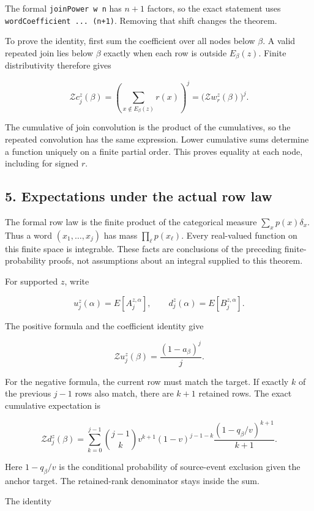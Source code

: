 The formal \texttt{joinPower\ w\ n} has \(n+1\) factors, so the exact statement uses \texttt{wordCoefficient\ ...\ (n+1)}. Removing that shift changes the theorem.

To prove the identity, first sum the coefficient over all nodes below \(\beta\). A valid repeated join lies below \(\beta\) exactly when each row is outside \(E_\beta(z)\). Finite distributivity therefore gives

\[
\mathcal Zc_j^z(\beta)
=\left(\sum_{x\notin E_\beta(z)}r(x)\right)^j
=\bigl(\mathcal Zw_r^z(\beta)\bigr)^j.
\]

The cumulative of join convolution is the product of the cumulatives, so the repeated convolution has the same expression. Lower cumulative sums determine a function uniquely on a finite partial order. This proves equality at each node, including for signed \(r\).

\subsection{5. Expectations under the actual row law}\label{expectations-under-the-actual-row-law}

The formal row law is the finite product of the categorical measure \(\sum_xp(x)\delta_x\). Thus a word \((x_1,\ldots,x_j)\) has mass \(\prod_\ell p(x_\ell)\). Every real-valued function on this finite space is integrable. These facts are conclusions of the preceding finite-probability proofs, not assumptions about an integral supplied to this theorem.

For supported \(z\), write

\[
u_j^z(\alpha)=E[A_j^{z,\alpha}],\qquad
d_j^z(\alpha)=E[B_j^{z,\alpha}].
\]

The positive formula and the coefficient identity give

\[
\mathcal Zu_j^z(\beta)=\frac{(1-a_\beta)^j}{j}.
\]

For the negative formula, the current row must match the target. If exactly \(k\) of the previous \(j-1\) rows also match, there are \(k+1\) retained rows. The exact cumulative expectation is

\[
\mathcal Zd_j^z(\beta)=
\sum_{k=0}^{j-1}\binom{j-1}{k}
v^{k+1}(1-v)^{j-1-k}
\frac{(1-q_\beta/v)^{k+1}}{k+1}.
\]

Here \(1-q_\beta/v\) is the conditional probability of source-event exclusion given the anchor target. The retained-rank denominator stays inside the sum.

The identity

